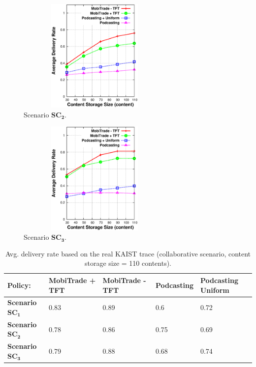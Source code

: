 \begin{figure}[!h]
  \begin{center}
    \includegraphics[width=3in,height=2.2in]{Chapitre5/fig4.eps}
  \end{center}
  \caption{Scenario $\mathbf{SC_2}$.}
  \label{CS+RNC+FCS}
\end{figure}

\begin{figure}[!h]
  \begin{center}
    \includegraphics[width=3in,height=2.2in]{Chapitre5/fig7.eps}
  \end{center}
  \caption{Scenario $\mathbf{SC_3}$.}
  \label{CS+FNC+RCS}
\end{figure}


\begin{table}[!h]
\vspace{-0.1in}
\caption{Avg. delivery rate based on the real KAIST trace (collaborative scenario, content storage size = 110 contents).}
\centering
\label{table:kaist:col}
\footnotesize
\begin{tabular}{|p{3cm}|p{2cm}|p{2cm}|p{2cm}|p{2cm}|}
\hline
\bfseries Policy:& \bfseries MobiTrade + TFT & \bfseries MobiTrade - TFT & \bfseries Podcasting & \bfseries Podcasting Uniform\\
\hline
\bfseries Scenario $\mathbf{SC_{1}}$ & 0.83 & 0.89&0.6 &0.72\\
\hline
\bfseries Scenario $\mathbf{SC_{2}}$ & 0.78 &0.86 &0.75 &0.69\\
\hline
\bfseries Scenario $\mathbf{SC_{3}}$ &0.79  &0.88 &0.68 &0.74\\
\hline
\end{tabular}
\end{table}


